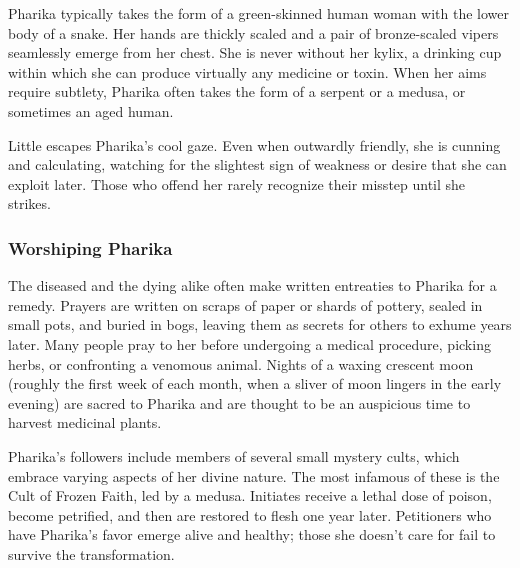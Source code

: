     Pharika typically takes the form of a green-skinned human woman with the lower body of a snake. Her hands are thickly scaled and a pair of bronze-scaled vipers seamlessly emerge from her chest. She is never without her kylix, a drinking cup within which she can produce virtually any medicine or toxin. When her aims require subtlety, Pharika often takes the form of a serpent or a medusa, or sometimes an aged human.

    Little escapes Pharika's cool gaze. Even when outwardly friendly, she is cunning and calculating, watching for the slightest sign of weakness or desire that she can exploit later. Those who offend her rarely recognize their misstep until she strikes.

    \subsubsection{Worshiping Pharika}
        The diseased and the dying alike often make written entreaties to Pharika for a remedy. Prayers are written on scraps of paper or shards of pottery, sealed in small pots, and buried in bogs, leaving them as secrets for others to exhume years later. Many people pray to her before undergoing a medical procedure, picking herbs, or confronting a venomous animal. Nights of a waxing crescent moon (roughly the first week of each month, when a sliver of moon lingers in the early evening) are sacred to Pharika and are thought to be an auspicious time to harvest medicinal plants.

        Pharika's followers include members of several small mystery cults, which embrace varying aspects of her divine nature. The most infamous of these is the Cult of Frozen Faith, led by a medusa. Initiates receive a lethal dose of poison, become petrified, and then are restored to flesh one year later. Petitioners who have Pharika's favor emerge alive and healthy; those she doesn't care for fail to survive the transformation.
